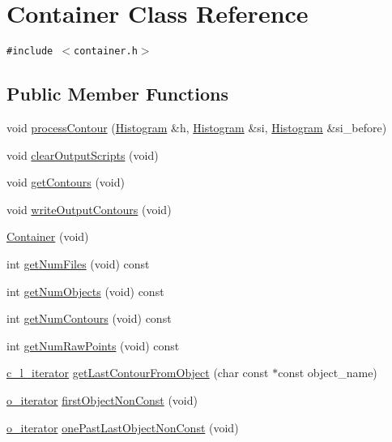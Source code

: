 \hypertarget{classContainer}{
\section{Container Class Reference}
\label{classContainer}
}
{\tt \#include $<$container.h$>$}

\subsection*{Public Member Functions}
\begin{CompactItemize}
\item 
void \hyperlink{classContainer_295064be4c1946c8e46211c8f99d8571}{processContour} (\hyperlink{classHistogram}{Histogram} \&h, \hyperlink{classHistogram}{Histogram} \&si, \hyperlink{classHistogram}{Histogram} \&si\_\-before)
\item 
void \hyperlink{classContainer_644b795e93a137c9eef2c6c1fa53a72f}{clearOutputScripts} (void)
\item 
void \hyperlink{classContainer_7bf4bb6083f930f0896e4b0bb583344f}{getContours} (void)
\item 
void \hyperlink{classContainer_f9c135209162b0ea5e8395e982241f0d}{writeOutputContours} (void)
\item 
\hyperlink{classContainer_5231ead51bcdd1a9b1f497414e76b6f4}{Container} (void)
\item 
int \hyperlink{classContainer_1543921a3bdcf71968d6c78fa8adf67c}{getNumFiles} (void) const 
\item 
int \hyperlink{classContainer_c78719a0e41e087c64a6e3dee6bebdff}{getNumObjects} (void) const 
\item 
int \hyperlink{classContainer_0961f692ac0f51aa90643d2c4b7e01ff}{getNumContours} (void) const 
\item 
int \hyperlink{classContainer_5475d8d32538e480fc5e840a9f64f4ff}{getNumRawPoints} (void) const 
\item 
\hyperlink{object_8h_7f9b7c0270c54ab6a3a2cc02f9fb313a}{c\_\-l\_\-iterator} \hyperlink{classContainer_eeb8e3e0db9a84db46f9c7098f52f548}{getLastContourFromObject} (char const $\ast$const object\_\-name)
\item 
\hyperlink{container_8h_b1419b33b75b9fdefb8af198aca79708}{o\_\-iterator} \hyperlink{classContainer_ecb2781bea92151778ac3133c9d43f37}{firstObjectNonConst} (void)
\item 
\hyperlink{container_8h_b1419b33b75b9fdefb8af198aca79708}{o\_\-iterator} \hyperlink{classContainer_bf9778c6bfa5a23133ced6d5d8d66434}{onePastLastObjectNonConst} (void)

\end{CompactItemize}
